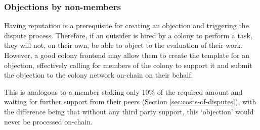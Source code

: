 \subsubsection{Objections by non-members}

Having reputation is a prerequisite for creating an objection and triggering the dispute process. Therefore, if an outsider is hired by a colony to perform a task, they will not, on their own, be able to object to the evaluation of their work. However, a good colony frontend may allow them to create the template for an objection, effectively calling for members of the colony to support it and submit the objection to the colony network on-chain on their behalf.  

This is analogous to a member staking only 10\% of the required amount and waiting for further support from their peers (Section \ref{sec:costs-of-disputes}), with the difference being that without any third party support, this `objection' would never be processed on-chain.